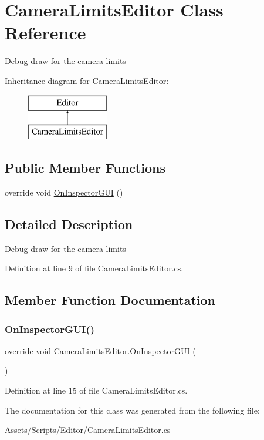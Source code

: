 \hypertarget{class_camera_limits_editor}{}\section{Camera\+Limits\+Editor Class Reference}
\label{class_camera_limits_editor}


Debug draw for the camera limits  


Inheritance diagram for Camera\+Limits\+Editor\+:\begin{figure}[H]
\begin{center}
\leavevmode
\includegraphics[height=2.000000cm]{class_camera_limits_editor}
\end{center}
\end{figure}
\subsection*{Public Member Functions}
\begin{DoxyCompactItemize}
\item 
override void \mbox{\hyperlink{class_camera_limits_editor_a0318256f1d3e4d621e31bc51ab4645ad}{On\+Inspector\+G\+UI}} ()
\end{DoxyCompactItemize}


\subsection{Detailed Description}
Debug draw for the camera limits 



Definition at line 9 of file Camera\+Limits\+Editor.\+cs.



\subsection{Member Function Documentation}
\mbox{\label{class_camera_limits_editor_a0318256f1d3e4d621e31bc51ab4645ad}} 
\subsubsection{\texorpdfstring{On\+Inspector\+G\+U\+I()}{OnInspectorGUI()}}
{\footnotesize\ttfamily override void Camera\+Limits\+Editor.\+On\+Inspector\+G\+UI (\begin{DoxyParamCaption}{ }\end{DoxyParamCaption})}



Definition at line 15 of file Camera\+Limits\+Editor.\+cs.



The documentation for this class was generated from the following file\+:\begin{DoxyCompactItemize}
\item 
Assets/\+Scripts/\+Editor/\mbox{\hyperlink{_camera_limits_editor_8cs}{Camera\+Limits\+Editor.\+cs}}\end{DoxyCompactItemize}
